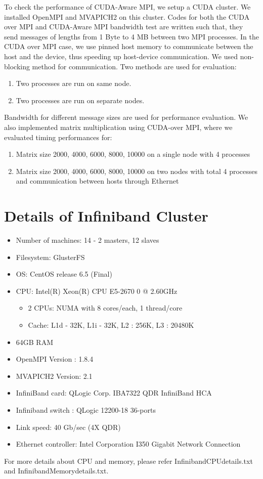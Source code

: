 \documentclass[10pt]{article}
\begin{document}
To check the performance of CUDA-Aware MPI, we setup a CUDA cluster. We installed OpenMPI and MVAPICH2 on this cluster. Codes for both the CUDA over MPI and CUDA-Aware MPI bandwidth test are written such that, they send messages of lengths from 1 Byte to 4 MB between two MPI processes. In the CUDA over MPI case, we use  pinned host memory to communicate between the host and the device, thus speeding up host-device communication. We used non-blocking method for communication. 
Two methods are used for evaluation:
\begin{enumerate}
\item Two processes are run on same node.
\item Two processes are run on separate nodes.
\end{enumerate}  
Bandwidth for different message sizes are used for performance  evaluation.
We also implemented matrix multiplication using CUDA-over MPI, where we evaluated timing performances for:
\begin{enumerate}
\item Matrix size 2000, 4000, 6000, 8000, 10000 on a single node with 4 processes
\item Matrix size 2000, 4000, 6000, 8000, 10000 on two nodes with total 4 processes and communication between hosts through Ethernet
\end{enumerate}

\section{Details of Infiniband Cluster}
\begin{itemize}
\item Number of machines: 14 -  2 masters, 12 slaves
\item Filesystem: GlusterFS
\item OS: CentOS release 6.5 (Final)
\item CPU: Intel(R) Xeon(R) CPU E5-2670 0 @ 2.60GHz
\begin{itemize}
\item 2 CPUs: NUMA with 8 cores/each, 1 thread/core
\item Cache: L1d - 32K, L1i - 32K, L2 : 256K, L3 : 20480K
\end{itemize}
\item 64GB RAM
\item OpenMPI Version : 1.8.4
\item MVAPICH2 Version: 2.1
\item InfiniBand card: QLogic Corp. IBA7322 QDR InfiniBand HCA
\item Infiniband switch : QLogic 12200-18 36-ports
\item Link speed: 40 Gb/sec (4X QDR)
\item Ethernet controller: Intel Corporation I350 Gigabit Network Connection
\end{itemize}
For more details about CPU and memory, please refer Infiniband\textunderscore CPU\textunderscore details.txt and Infiniband\textunderscore Memory\textunderscore details.txt.
\end{document}
